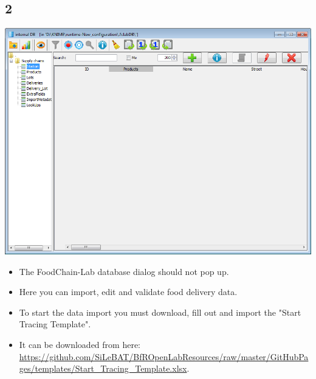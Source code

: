 \documentclass{beamer}
\begin{document}
\subsection{2}
\begin{frame}
	\begin{center}
  		\includegraphics[height=0.5\textheight]{2.png}
	\end{center}
	\begin{itemize}
		\item The FoodChain-Lab database dialog should not pop up.
		\item Here you can import, edit and validate food delivery data.
		\item To start the data import you must download, fill out and import the "Start Tracing Template".
		\item It can be downloaded from here: \url{https://github.com/SiLeBAT/BfROpenLabResources/raw/master/GitHubPages/templates/Start_Tracing_Template.xlsx}.
	\end{itemize}
\end{frame}
\end{document}
